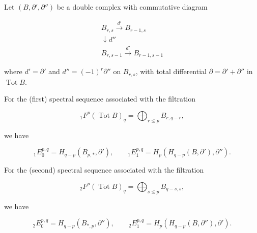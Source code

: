 Let $(B, \partial', \partial'')$ be a double complex with commutative diagram

$$
\begin{array}{c}
B_{r,s} \xrightarrow{d'} B_{r-1,s} \\
\downarrow d'' \\
B_{r,s-1} \xrightarrow{d'} B_{r-1,s-1}
\end{array}
$$

where $d' = \partial'$ and $d'' = (-1)^r \partial''$ on $B_{r,s}$, with total differential $\partial = \partial' + \partial''$ in $\operatorname{Tot} B$.

For the (first) spectral sequence associated with the filtration

$${}_1 F^p(\operatorname{Tot} B)_q = \bigoplus_{r \leq p} B_{r, q-r},$$

we have

$${}_1 E_0^{p,q} = H_{q-p}(B_{p,*}, \partial'), \qquad {}_1 E_1^{p,q} = H_p(H_{q-p}(B, \partial'), \partial'').$$

For the (second) spectral sequence associated with the filtration

$${}_2 F^p(\operatorname{Tot} B)_q = \bigoplus_{s \leq p} B_{q-s, s},$$

we have

$${}_2 E_0^{p,q} = H_{q-p}(B_{*,p}, \partial''), \qquad {}_2 E_1^{p,q} = H_p(H_{q-p}(B, \partial''), \partial').$$
